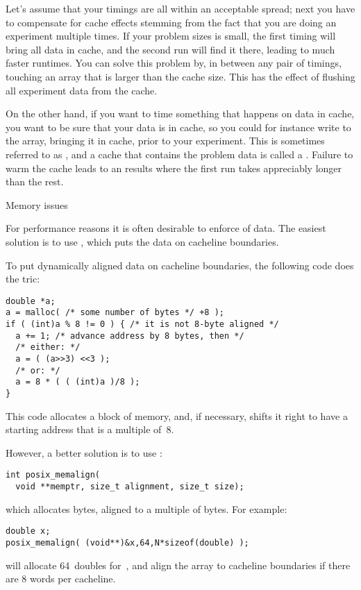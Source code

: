 Let's assume that your timings are all within an acceptable spread;
next you have to compensate for cache effects stemming from the fact that
you are doing an experiment multiple times. If your problem sizes is small,
the first timing will bring all data in cache, and the second run
will find it there, leading to much faster runtimes. You can solve this 
problem by, in between any pair of timings, touching an array
that is larger than the cache size. This has the effect of flushing
all experiment data from the cache.

On the other hand, if you want to time something that happens on data
in cache, you want to be sure that your data is in cache, so you could
for instance write to the array, bringing it in cache, prior to your
experiment. This is sometimes referred to
as , and a cache that contains the
problem data is called a . Failure to warm
the cache leads to an results where the first run takes appreciably 
longer than the rest.

 {Memory issues}
\label{sec:memalign}

For performance reasons it is often desirable to enforce
 of data.
The easiest solution is to use ,
which puts the data on cacheline boundaries.

To put dynamically aligned data on cacheline boundaries, the
following code does the tric:
\begin{lstlisting}
double *a;
a = malloc( /* some number of bytes */ +8 );
if ( (int)a % 8 != 0 ) { /* it is not 8-byte aligned */
  a += 1; /* advance address by 8 bytes, then */
  /* either: */
  a = ( (a>>3) <<3 );
  /* or: */
  a = 8 * ( ( (int)a )/8 );
}
\end{lstlisting}
This code allocates a block of memory, and, if necessary, shifts it
right to have a starting address that is a multiple of~8.

However, a better solution is to use :
\begin{lstlisting}
int posix_memalign(
  void **memptr, size_t alignment, size_t size);
\end{lstlisting}
which allocates  bytes, aligned to a multiple of  bytes.
For example:
\begin{lstlisting}
double x;
posix_memalign( (void**)&x,64,N*sizeof(double) );
\end{lstlisting}
will allocate 64~doubles for~, and align the array
to cacheline boundaries if there are 8 words per cacheline.

